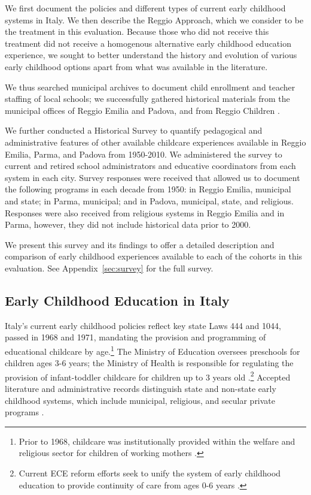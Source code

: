 We first document the policies and different types of current early childhood systems in Italy. We then describe the Reggio Approach, which we consider to be the treatment in this evaluation. Because those who did not receive this treatment did not receive a homogenous alternative early childhood education experience, we sought to better understand the history and evolution of various early childhood options apart from what was available in the literature. 

We thus searched municipal archives to document child enrollment and teacher staffing of local schools; we successfully gathered historical materials from the municipal offices of Reggio Emilia and Padova, and from Reggio Children \citep{Padova-Admin-Data_1964-2011,Reggio-Admin-data_1966-2006,Reggio-Annual-Journals_1994-2011}. 

We further conducted a Historical Survey to quantify pedagogical and administrative features of other available childcare experiences available in Reggio Emilia, Parma, and Padova from 1950-2010. We administered the survey to current and retired school administrators and educative coordinators from each system in each city. Survey responses were received that allowed us to document the following programs in each decade from 1950: in Reggio Emilia, municipal and state; in Parma, municipal; and in Padova, municipal, state, and religious. Responses were also received from religious systems in Reggio Emilia and in Parma, however, they did not include historical data prior to 2000. 

We present this survey and its findings to offer a detailed description and comparison of early childhood experiences available to each of the cohorts in this evaluation. See Appendix~\ref{sec:survey} for the full survey.

\subsection{Early Childhood Education in Italy}

Italy's current early childhood policies reflect key state Laws 444 and 1044, passed in 1968 and 1971, mandating the provision and programming of educational childcare by age.\footnote{Prior to 1968, childcare was institutionally provided within the welfare and religious sector for children of working mothers \citep{OECD_2001_Italy-Country-Note,Hohnerlein_2015_Development-and-DiffusionEnrollment}.} The Ministry of Education oversees preschools for children ages 3-6 years; the Ministry of Health is responsible for regulating the provision of infant-toddler childcare for children up to 3 years old \citep{Corsaro_1996_Early-Edu}.\footnote{Current ECE reform efforts seek to unify the system of early childhood education to provide continuity of care from ages 0-6 years \citep{CEHD_2016_Historical-Analysis}.} Accepted literature and administrative records distinguish state and non-state early childhood systems, which include municipal, religious, and secular private programs \citep{Padova-Admin-Data_1964-2011,Reggio-Admin-data_1966-2006,Reggio-Annual-Journals_1994-2011,OECD_2001_Italy-Country-Note,Ribolzi_2013_Italy}. 

